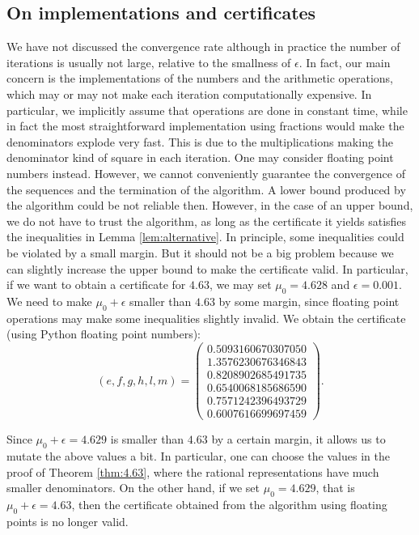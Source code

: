 \documentclass[a4paper,12pt]{article}
\begin{document}
\subsection*{On implementations and certificates}
We have not discussed the convergence rate although in practice the number of iterations is usually not large, relative to the smallness of $\epsilon$. In fact, our main concern is the implementations of the numbers and the arithmetic operations, which may or may not make each iteration computationally expensive. In particular, we implicitly assume that operations are done in constant time, while in fact the most straightforward implementation using fractions would make the denominators explode very fast. This is due to the multiplications making the denominator kind of square in each iteration. One may consider floating point numbers instead. However, we cannot conveniently guarantee the convergence of the sequences and the termination of the algorithm. A lower bound produced by the algorithm could be not reliable then. However, in the case of an upper bound, we do not have to trust the algorithm, as long as the certificate it yields satisfies the inequalities in Lemma \ref{lem:alternative}. In principle, some inequalities could be violated by a small margin. But it should not be a big problem because we can slightly increase the upper bound to make the certificate valid.
In particular, if we want to obtain a certificate for $4.63$, we may set $\mu_0=4.628$ and $\epsilon=0.001$. We need to make $\mu_0+\epsilon$ smaller than $4.63$ by some margin, since floating point operations may make some inequalities slightly invalid. We obtain the certificate (using Python floating point numbers):
\[
(e,f,g,h,l,m)=
\begin{pmatrix}
0.5093160670307050 \\
1.3576230676346843 \\
0.8208902685491735 \\
0.6540068185686590 \\
0.7571242396493729 \\
0.6007616699697459
\end{pmatrix}.
\]

Since $\mu_0+\epsilon=4.629$ is smaller than $4.63$ by a certain margin, it allows us to mutate the above values a bit. In particular, one can choose the values in the proof of Theorem \ref{thm:4.63}, where the rational representations have much smaller denominators. On the other hand, if we set $\mu_0=4.629$, that is $\mu_0+\epsilon=4.63$, then the certificate obtained from the algorithm using floating points is no longer valid.
\end{document}
